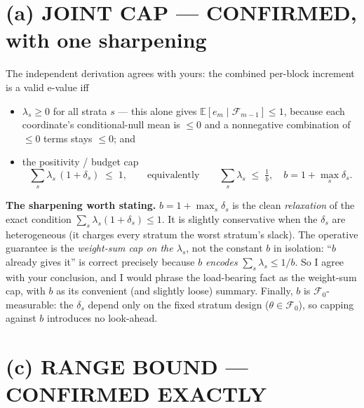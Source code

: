 \documentclass[11pt,a4paper]{article}
\begin{document}
\section*{(a) JOINT CAP --- CONFIRMED, with one sharpening}

\noindent The independent derivation agrees with yours: the combined per-block
increment is a valid e-value iff
\begin{itemize}
\item[(i)] $\lambda_s \ge 0$ for all strata $s$ --- this alone gives
  $\mathbb{E}[e_m \mid \mathcal{F}_{m-1}] \le 1$, because each coordinate's
  conditional-null mean is $\le 0$ and a nonnegative combination of
  $\le 0$ terms stays $\le 0$; and
\item[(ii)] the positivity / budget cap
  \[
    \sum_s \lambda_s\,(1 + \delta_s) \;\le\; 1,
    \qquad\text{equivalently}\qquad
    \sum_s \lambda_s \;\le\; \tfrac{1}{b},
    \quad b = 1 + \max_s \delta_s .
  \]
\end{itemize}

\noindent\textbf{The sharpening worth stating.} $b = 1 + \max_s \delta_s$ is the
clean \emph{relaxation} of the exact condition
$\sum_s \lambda_s (1 + \delta_s) \le 1$. It is slightly conservative when the
$\delta_s$ are heterogeneous (it charges every stratum the worst stratum's slack).
The operative guarantee is the \emph{weight-sum cap on the $\lambda_s$}, not the
constant $b$ in isolation: ``$b$ already gives it'' is correct precisely because
$b$ \emph{encodes} $\sum_s \lambda_s \le 1/b$. So I agree with your conclusion,
and I would phrase the load-bearing fact as the weight-sum cap, with $b$ as its
convenient (and slightly loose) summary. Finally, $b$ is
$\mathcal{F}_0$-measurable: the $\delta_s$ depend only on the fixed stratum design
($\theta \in \mathcal{F}_0$), so capping against $b$ introduces no look-ahead.

\section*{(c) RANGE BOUND --- CONFIRMED EXACTLY}
\end{document}
